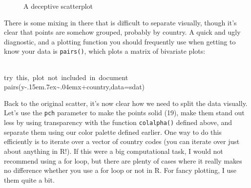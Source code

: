 \documentclass[a4paper]{article}
\newcommand{\hlcomment}[1]{\textcolor[rgb]{0.8,0.8,0.8}{#1}}%
\newcommand{\hlprompt}[1]{\textcolor[rgb]{0,0,0}{#1}}%
\def\urltilda{\kern -.15em\lower .7ex\hbox{\~{}}\kern .04em}%
\newcommand{\hlstd}[1]{\textcolor[rgb]{0,0,0}{#1}}%
\newenvironment{Houtput}{\raggedright}{%
%
}
\begin{document}
\begin{figure}[H]
\centering

{\tikzexternaldisable

}
\caption{A deceptive scatterplot}
\end{figure}

There is some mixing in there that is difficult to separate visually, though it's clear that points are somehow grouped, probably by country. A quick and ugly diagnostic, and a plotting function you should frequently use when getting to know your data is \texttt{pairs()}, which plots a matrix of bivariate plots:

\begin{Houtput}
\hspace*{\fill}\\
\hlstd{}\ttfamily\noindent
\hlprompt{\usebox{\hlnormalsizeboxgreaterthan}{\ }}\hlcomment{\usebox{\hlnormalsizeboxhash}{\ }try{\ }this,{\ }plot{\ }not{\ }included{\ }in{\ }document}\mbox{}
\normalfont
\hspace*{\fill}\\
\hlstd{}\ttfamily\noindent
\hlprompt{\usebox{\hlnormalsizeboxgreaterthan}{\ }}\hlcomment{\usebox{\hlnormalsizeboxhash}{\ }pairs(y\urltilda{}x+country,data=sdat)}\mbox{}
\normalfont
\hspace*{\fill}\\
\hlstd{}
\end{Houtput}

Back to the original scatter, it's now clear how we need to split the data visually. Let's use the \texttt{pch} parameter to make the points solid (19), make them stand out less by using transparency with the function \texttt{colalpha()} defined above, and separate them using our color palette defined earlier. One way to do this efficiently is to iterate over a vector of country codes (you can iterate over just about anything in R!). If this were a big computational task, I would not recommend using a for loop, but there are plenty of cases where it really makes no difference whether you use a for loop or not in R. For fancy plotting, I use them quite a bit. 
\end{document}
